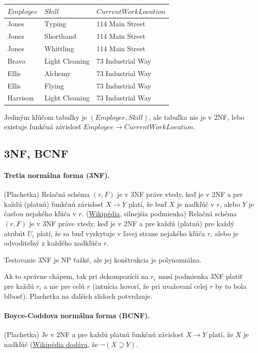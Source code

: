 \documentclass[10pt,a4paper]{article}
\begin{document}
\begin{center}
\begin{tabular}{l|l|l}
$Employee$ & $Skill$ & $Current Work Location$ \\
\hline
Jones &	Typing &	114 Main Street \\
Jones &	Shorthand &	114 Main Street \\
Jones &	Whittling &	114 Main Street \\
Bravo &	Light Cleaning &	73 Industrial Way \\
Ellis &	Alchemy &	73 Industrial Way \\
Ellis &	Flying &	73 Industrial Way \\
Harrison &	Light Cleaning &	73 Industrial Way \\
\end{tabular}
\end{center}

Jediným kľúčom tabuľky je $(Employee, Skill)$, ale tabuľka nie je v 2NF, lebo existuje funkčná závislosť $Employee \rightarrow Current Work Location$.

\subsection{3NF, BCNF}

\paragraph{Tretia normálna forma (3NF).} (Plachetka) Relačná schéma $(r,F)$ je v 3NF práve vtedy, keď je v 2NF a pre každú (platnú) funkčnú závislosť $X \rightarrow Y$ platí, že buď $X$ je nadkľúč v $r$, alebo $Y$ je časťou nejakého kľúča v $r$.
(\href{http://en.wikipedia.org/wiki/Third_normal_form}{Wikipédia}, silnejšia podmienka) Relačná schéma $(r,F)$ je v 3NF práve vtedy, keď je v 2NF a pre každú (platnú) pre každý atribút $U_i$ platí, že sa buď vyskytuje v ľavej strane nejakého kľúča $r$, alebo je odvoditeľný z každého nadkľúča $r$.

Testovanie 3NF je NP ťažké, ale jej konštrukcia je polynomiálna.

Ak to správne chápem, tak pri dekompozícii na $r_i$ musí podmienka 3NF platiť pre každú $r_i$ a nie pre celú $r$ (intuícia hovorí, že pri uvažovaní celej $r$ by to bola blbosť).
Plachetka na ďalších slidoch potvrdzuje.

\paragraph{Boyce-Coddova normálna forma (BCNF).} (Plachetka) Je v 2NF a pre každú platnú funkčnú závislosť $X \rightarrow Y$ platí, že $X$ je nadkľúč (\href{http://en.wikipedia.org/wiki/Boyce\%E2\%80\%93Codd_normal_form}{Wikipédia dodáva}, že $\neg (X \supseteq Y)$.
\end{document}
